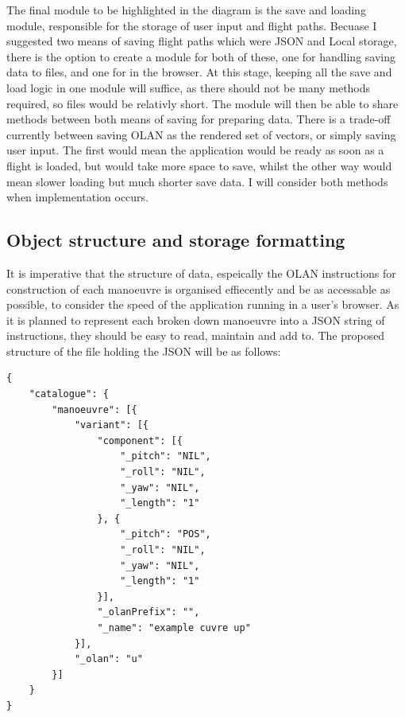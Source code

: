 The final module to be highlighted in the diagram is the save and loading module, responsible for the storage of user input and flight paths. Becuase I suggested two means of saving flight paths which were JSON and Local storage, there is the option to create a module for both of these, one for handling saving data to files, and one for in the browser. At this stage, keeping all the save and load logic in one module will suffice, as there should not be many methods required, so files would be relativly short. The module will then be able to share methods between both means of saving for preparing data. There is a trade-off currently between saving OLAN as the rendered set of vectors, or simply saving user input. The first would mean the application would be ready as soon as a flight is loaded, but would take more space to save, whilst the other way would mean slower loading but much shorter save data. I will consider both methods when implementation occurs.

\subsection{Object structure and storage formatting}
It is imperative that the structure of data, espeically the OLAN instructions for construction of each manoeuvre is organised effiecently and be as accessable as possible, to consider the speed of the application running in a user's browser. As it is planned to represent each broken down manoeuvre into a JSON string of instructions, they should be easy to read, maintain and add to. The proposed structure of the file holding the JSON will be as follows:

\lstset{language=JavaScript}
\medskip
\begin{lstlisting}[caption=A JSON means of holding break downs of manouvres with each one holding information on different varients of the move such as inverse and reverse and description of the OLAN notation]
{
    "catalogue": {
        "manoeuvre": [{
            "variant": [{
                "component": [{
                    "_pitch": "NIL",
                    "_roll": "NIL",
                    "_yaw": "NIL",
                    "_length": "1"
                }, {
                    "_pitch": "POS",
                    "_roll": "NIL",
                    "_yaw": "NIL",
                    "_length": "1"
                }],
                "_olanPrefix": "",
                "_name": "example cuvre up"
            }],
            "_olan": "u"
       	}]
   	}
}
\end{lstlisting}
\label{listing:json}

